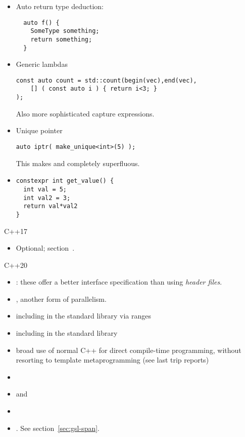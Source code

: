 \begin{itemize}
\item
  Auto return type deduction:
\begin{lstlisting}
  auto f() {
    SomeType something;
    return something;
  }
\end{lstlisting}

\item Generic lambdas
\begin{lstlisting}
const auto count = std::count(begin(vec),end(vec),
    [] ( const auto i ) { return i<3; }    
);
\end{lstlisting}
Also more sophisticated capture expressions.

\item Unique pointer
\begin{lstlisting}
auto iptr( make_unique<int>(5) );    
\end{lstlisting}
This makes  and  completely superfluous.

\item {}
\begin{lstlisting}
constexpr int get_value() {
  int val = 5;
  int val2 = 3;
  return val*val2
}
\end{lstlisting}
\end{itemize}


 {C++17}

\begin{itemize}
\item  Optional; section~\label{sec:std-optional}.
\end{itemize}

 {C++20}


\begin{itemize}
\item   {}: these offer a better interface
  specification than using
  \emph{header files}.
\item   {}, another form of parallelism.
\item   {} including in the standard library via ranges
\item   {} including in the standard library
\item   broad use of normal C++ for direct compile-time programming, without
  resorting to template metaprogramming (see last trip reports)
\item {}
\item   {} and 
\item   {}
\item {}. See section~\ref{sec:gsl-span}.
\end{itemize}
